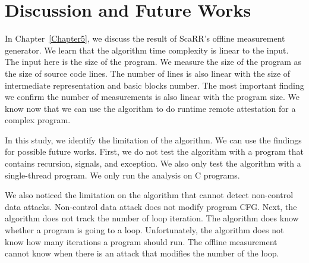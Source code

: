 
\chapter{Discussion and Future Works} %

\label{Chapter6} %

In Chapter~\ref{Chapter5}, we discuss the result of ScaRR's offline measurement
generator. We learn that the algorithm time complexity is linear to the input.
The input here is the size of the program. We measure the size of the program as
the size of source code lines. The number of lines is also linear with the size
of intermediate representation and basic blocks number. The most important
finding we confirm the number of measurements is also linear with the program
size. We know now that we can use the algorithm to do runtime remote attestation
for a complex program.

In this study, we identify the limitation of the algorithm. We can use the
findings for possible future works. First, we do not test the algorithm with a
program that contains recursion, signals, and exception. We also only test the
algorithm with a single-thread program. We only run the analysis on C programs.

We also noticed the limitation on the algorithm that cannot detect non-control
data attacks. Non-control data attack does not modify program CFG. Next, the
algorithm does not track the number of loop iteration. The algorithm does know
whether a program is going to a loop. Unfortunately, the algorithm does not know
how many iterations a program should run. The offline measurement cannot know
when there is an attack that modifies the number of the loop. 